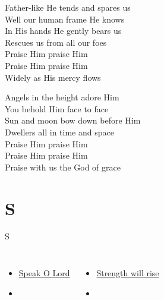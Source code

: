 \documentclass[aspectratio=169]{beamer}
\begin{document}
{\begin{frame}{}
\end{frame}
\hypertarget{Praise, my soul, the King of heaven[]3}{}
\begin{frame}{}
\fontsize{21.428571428571427}{25.71428571428571}\selectfont

Father-like He tends and spares us\\ 
Well our human frame He knows\\ 
In His hands He gently bears us\\ 
Rescues us from all our foes\\ 
Praise Him praise Him\\ 
Praise Him praise Him\\ 
Widely as His mercy flows

\end{frame}
\hypertarget{Praise, my soul, the King of heaven[]4}{}
\begin{frame}{}
\fontsize{21.428571428571427}{25.71428571428571}\selectfont

Angels in the height adore Him\\ 
You behold Him face to face\\ 
Sun and moon bow down before Him\\ 
Dwellers all in time and space\\ 
Praise Him praise Him\\ 
Praise Him praise Him\\ 
Praise with us the God of grace

\end{frame}
}

\section{ S }

\begin{frame}[t]{S}
\begin{columns}[t]
\begin{itemize}
    \item \hyperlink{Speak O Lord[](Getty/Townend)}{Speak O Lord}
    \item[] \phantom{1}
\end{itemize}
\begin{itemize}
    \item \hyperlink{Everlasting God['Strength will rise']}{Strength will rise}
    \item[] \phantom{1}
\end{itemize}
\end{columns}
\end{frame}
\end{document}

